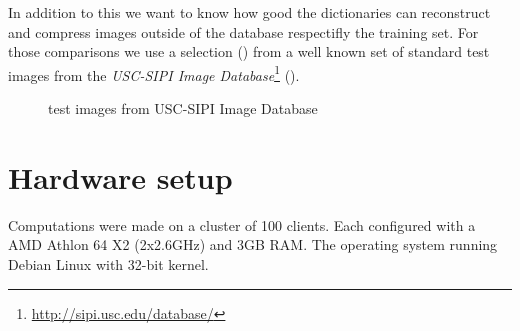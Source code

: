 In addition to this we want to know how good the dictionaries can reconstruct
and compress images outside of the database respectifly the training set. For
those comparisons we use a selection () from a
well known set of standard test images from the \emph{USC-SIPI Image
Database}\footnote{\url{http://sipi.usc.edu/database/}}
(). 
\begin{figure}[H]
\centering
\hspace{5mm}
\hspace{5mm}
\caption{test images from USC-SIPI Image Database}
\label{fig:USC-SIPI}
\end{figure}

\section{Hardware setup} 
Computations were made on a cluster of 100 clients. Each 
configured with a AMD Athlon 64 X2 (2x2.6GHz) and 3GB RAM.
The operating system running Debian Linux with 32-bit kernel. 

